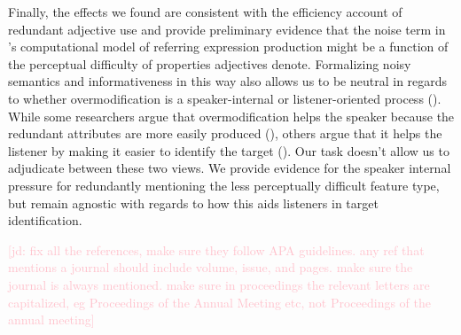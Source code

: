 \documentclass[12pt,letterpaper]{article}
\newcommand{\jd}[1]{\textcolor{Pink}{[jd: #1]}}
\begin{document}
Finally, the effects we found are consistent with the efficiency account of redundant adjective use and provide preliminary evidence that the noise term in \citet{DegenEtAl2020}'s computational model of referring expression production might be a function of the perceptual difficulty of properties adjectives denote. Formalizing noisy semantics and informativeness in this way also allows us to be neutral in regards to whether overmodification is a speaker-internal or listener-oriented process (\citealt{Arnold2008}). While some researchers argue that overmodification helps the speaker because the redundant attributes are more easily produced (\citealt{DaviesKatsos2013, KoolenEtAl2013}), others argue that it helps the listener by making it easier to identify the target (\citealt{FussellKraus1989a, ArtsEtAl2011,RubioFernandez2016}). Our task doesn't allow us to adjudicate between these two views. We provide evidence for the speaker internal pressure for redundantly mentioning the less perceptually difficult feature type, but remain agnostic with regards to how this aids listeners in target identification.

\jd{fix all the references, make sure they follow APA guidelines. any ref that mentions a journal should include volume, issue, and pages. make sure the journal is always mentioned. make sure in proceedings the relevant letters are capitalized, eg Proceedings of the Annual Meeting etc, not Proceedings of the annual meeting}

\end{document}

